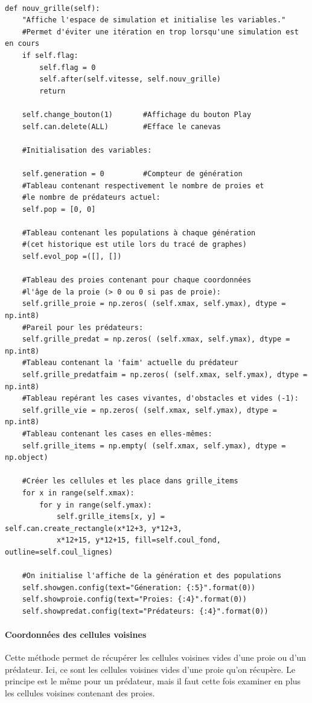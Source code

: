 \documentclass[11pt]{article}
\begin{document}
\begin{verbatim}

def nouv_grille(self):
    "Affiche l'espace de simulation et initialise les variables."
    #Permet d'éviter une itération en trop lorsqu'une simulation est en cours
    if self.flag:                                   
        self.flag = 0
        self.after(self.vitesse, self.nouv_grille)  
        return
        
    self.change_bouton(1)       #Affichage du bouton Play
    self.can.delete(ALL)        #Efface le canevas
        
    #Initialisation des variables:
    
    self.generation = 0         #Compteur de génération
    #Tableau contenant respectivement le nombre de proies et 
    #le nombre de prédateurs actuel:
    self.pop = [0, 0]       
    
    #Tableau contenant les populations à chaque génération
    #(cet historique est utile lors du tracé de graphes)
    self.evol_pop =([], []) 
    
    #Tableau des proies contenant pour chaque coordonnées
    #l'âge de la proie (> 0 ou 0 si pas de proie):
    self.grille_proie = np.zeros( (self.xmax, self.ymax), dtype = np.int8)
    #Pareil pour les prédateurs:
    self.grille_predat = np.zeros( (self.xmax, self.ymax), dtype = np.int8)
    #Tableau contenant la 'faim' actuelle du prédateur
    self.grille_predatfaim = np.zeros( (self.xmax, self.ymax), dtype = np.int8)   
    #Tableau repérant les cases vivantes, d'obstacles et vides (-1):
    self.grille_vie = np.zeros( (self.xmax, self.ymax), dtype = np.int8)
    #Tableau contenant les cases en elles-mêmes:
    self.grille_items = np.empty( (self.xmax, self.ymax), dtype = np.object) 
    
    #Créer les cellules et les place dans grille_items
    for x in range(self.xmax): 
        for y in range(self.ymax): 
            self.grille_items[x, y] = self.can.create_rectangle(x*12+3, y*12+3,
            x*12+15, y*12+15, fill=self.coul_fond, outline=self.coul_lignes)
    
    #On initialise l'affiche de la génération et des populations
    self.showgen.config(text="Géneration: {:5}".format(0))
    self.showproie.config(text="Proies: {:4}".format(0))
    self.showpredat.config(text="Prédateurs: {:4}".format(0))

\end{verbatim}

\paragraph{Coordonnées des cellules voisines}
Cette méthode permet de récupérer les cellules voisines vides d'une proie ou d'un prédateur. Ici, ce sont les cellules voisines vides d'une proie qu'on récupère. Le principe est le même pour un prédateur, mais il faut cette fois examiner en plus les cellules voisines contenant des proies.
\end{document}
